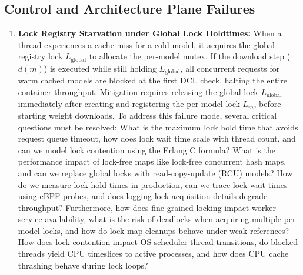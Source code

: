 \documentclass[11pt,a4paper]{article}
\theoremstyle{plain}
\theoremstyle{definition}
\theoremstyle{remark}
\newcommand{\Lm}{L_m}
\newcommand{\Lg}{L_{\mathrm{global}}}
\begin{document}
\begin{enumerate}[label=\textbf{DF\arabic*.}]
\end{enumerate}

\subsection{Control and Architecture Plane Failures}
\begin{enumerate}[label=\textbf{CF\arabic*.}]
    \item \textbf{Lock Registry Starvation under Global Lock Holdtimes:} 
    When a thread experiences a cache miss for a cold model, it acquires the global registry lock $\Lg$ to allocate the per-model mutex. If the download step ($d(m)$) is executed while still holding $\Lg$, all concurrent requests for warm cached models are blocked at the first DCL check, halting the entire container throughput. 
    Mitigation requires releasing the global lock $\Lg$ immediately after creating and registering the per-model lock $\Lm$, before starting weight downloads.
    To address this failure mode, several critical questions must be resolved: What is the maximum lock hold time that avoids request queue timeout, how does lock wait time scale with thread count, and can we model lock contention using the Erlang C formula? What is the performance impact of lock-free maps like lock-free concurrent hash maps, and can we replace global locks with read-copy-update (RCU) models? How do we measure lock hold times in production, can we trace lock wait times using eBPF probes, and does logging lock acquisition details degrade throughput? Furthermore, how does fine-grained locking impact worker service availability, what is the risk of deadlocks when acquiring multiple per-model locks, and how do lock map cleanups behave under weak references? How does lock contention impact OS scheduler thread transitions, do blocked threads yield CPU timeslices to active processes, and how does CPU cache thrashing behave during lock loops?


\end{enumerate}
\end{document}

